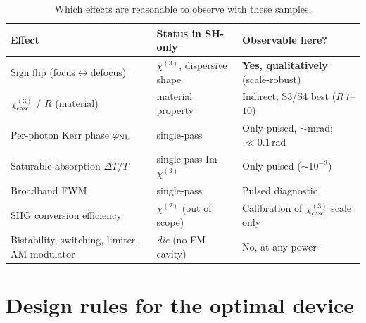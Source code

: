 \documentclass[11pt,a4paper]{article}
\newcommand{\chitwo}{\chi^{(2)}}
\newcommand{\chithree}{\chi^{(3)}}
\newcommand{\chicasc}{\chithree_{\text{casc}}}
\begin{document}
\begin{table}[H]
  \centering
  \caption{Which effects are reasonable to observe with these samples.}
  \label{tab:verdict}
  \small
  \setlength{\tabcolsep}{5pt}
  \begin{tabular}{@{}p{4.5cm}p{3.6cm}p{4.7cm}@{}}
    \toprule
    Effect & Status in SH-only & Observable here? \\
    \midrule
    Sign flip (focus$\leftrightarrow$defocus) & $\chithree$, dispersive shape & \textbf{Yes, qualitatively} (scale-robust) \\
    $\chicasc$ / $R$ (material)      & material property       & Indirect; S3/S4 best ($R\,7$--$10$) \\
    Per-photon Kerr phase $\varphi_{\rm NL}$  & single-pass     & Only pulsed, $\sim$mrad; $\ll0.1$\,rad \\
    Saturable absorption $\Delta T/T$ & single-pass Im $\chithree$ & Only pulsed ($\sim\!10^{-3}$) \\
    Broadband FWM                    & single-pass             & Pulsed diagnostic \\
    SHG conversion efficiency       & $\chitwo$ (out of scope) & Calibration of $\chicasc$ scale only \\
    Bistability, switching, limiter, AM modulator & \emph{die} (no FM cavity) & No, at any power \\
    \bottomrule
  \end{tabular}
\end{table}

\section{Design rules for the optimal device}
\label{sec:rules}
\end{document}
